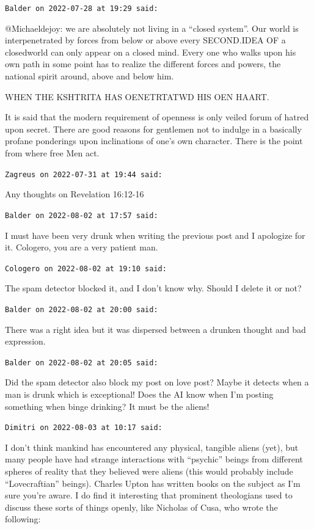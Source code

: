 \begin{footnotesize}
\begin{sffamily}
\texttt{Balder on 2022-07-28 at 19:29 said:}

@Michaeldejoy: we are absolutely not living in a ``closed system''. Our world is interpenetrated by forces from below or above every SECOND.IDEA OF a closedworld can only appear on a closed mind. Every one who walks upon his own path in some point has to realize the different forces and powers, the national spirit around, above and below him.

WHEN THE KSHTRITA HAS OENETRTATWD HIS OEN HAART.

It is said that the modern requirement of openness is only veiled forum of hatred upon secret. There are good reasons for gentlemen not to indulge in a basically profane ponderings upon inclinations of one's own character. There is the point from where free Men act.

\hfill

\texttt{Zagreus on 2022-07-31 at 19:44 said:}

Any thoughts on Revelation 16:12-16

\hfill

\texttt{Balder on 2022-08-02 at 17:57 said:}

I must have been very drunk when writing the previous post and I apologize for it. Cologero, you are a very patient man.

\hfill

\texttt{Cologero on 2022-08-02 at 19:10 said:}

The spam detector blocked it, and I don't know why. Should I delete it or not?

\hfill

\texttt{Balder on 2022-08-02 at 20:00 said:}

There was a right idea but it was dispersed between a drunken thought and bad expression.

\hfill

\texttt{Balder on 2022-08-02 at 20:05 said:}

Did the spam detector also block my post on love post? Maybe it detects when a man is drunk which is exceptional! Does the AI know when I'm posting something when binge drinking? It must be the aliens!

\hfill

\texttt{Dimitri on 2022-08-03 at 10:17 said:}

I don't think mankind has encountered any physical, tangible aliens (yet), but many people have had strange interactions with ``psychic'' beings from different spheres of reality that they believed were aliens (this would probably include ``Lovecraftian'' beings). Charles Upton has written books on the subject as I'm sure you're aware. I do find it interesting that prominent theologians used to discuss these sorts of things openly, like Nicholas of Cusa, who wrote the following:


\end{sffamily}
\end{footnotesize}
